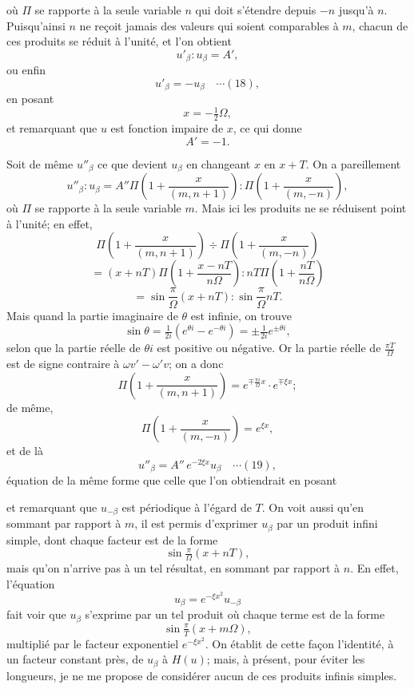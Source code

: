 \documentclass[12pt,a4paper]{article}
\begin{document}
\newpage
\setcounter{page}{166}

o\`u $\Pi$ se rapporte \`a la seule variable $n$ qui doit s'\'etendre depuis $-n$ jusqu'\`a $n$. Puisqu'ainsi $n$ ne re\c{c}oit jamais des valeurs qui soient comparables \`a $m$, chacun de ces produits se r\'eduit \`a l'unit\'e, et l'on obtient
\[
u'_\beta : u_\beta = A',
\]
ou enfin
\[
u'_\beta = -u_\beta \quad\cdots(18),
\]
en posant
\[
x = -\tfrac{1}{2}\Omega,
\]
et remarquant que $u$ est fonction impaire de $x$, ce qui donne
\[
A' = -1.
\]

Soit de m\^eme $u''_\beta$ ce que devient $u_\beta$ en changeant $x$ en $x + T$. On a pareillement
\[
u''_\beta : u_\beta = A''\Pi\!\left(1 + \frac{x}{(m,n+1)}\right) : \Pi\!\left(1 + \frac{x}{(m,-n)}\right),
\]
o\`u $\Pi$ se rapporte \`a la seule variable $m$. Mais ici les produits ne se r\'eduisent point \`a l'unit\'e; en effet,
\[
\Pi\!\left(1 + \frac{x}{(m,n+1)}\right) \div \Pi\!\left(1 + \frac{x}{(m,-n)}\right)
\]
\[
= (x + nT)\Pi\!\left(1 + \frac{x - nT}{n\Omega}\right) : nT\Pi\!\left(1 + \frac{nT}{n\Omega}\right)
\]
\[
= \sin\frac{\pi}{\Omega}(x + nT) : \sin\frac{\pi}{\Omega}nT.
\]
Mais quand la partie imaginaire de $\theta$ est infinie, on trouve
\[
\sin\theta = \tfrac{1}{2i}(e^{\theta i} - e^{-\theta i}) = \pm\tfrac{1}{2i}e^{\pm\theta i},
\]
selon que la partie r\'eelle de $\theta i$ est positive ou n\'egative. Or la partie r\'eelle de $\tfrac{\pi T}{\Omega}$ est de signe contraire \`a $\omega v' - \omega' v$; on a donc
\[
\Pi\!\left(1 + \frac{x}{(m,n+1)}\right) = e^{\mp\frac{\pi i}{\Omega}x}\cdot e^{\mp\xi x};
\]
de m\^eme,
\[
\Pi\!\left(1 + \frac{x}{(m,-n)}\right) = e^{\xi x},
\]
et de l\`a
\[
u''_\beta = A''\,e^{-2\xi x}u_\beta \quad\cdots(19),
\]
\'equation de la m\^eme forme que celle que l'on obtiendrait en posant

\newpage
\setcounter{page}{167}

et remarquant que $u_{-\beta}$ est p\'eriodique \`a l'\'egard de $T$. On voit aussi qu'en sommant par rapport \`a $m$, il est permis d'exprimer $u_\beta$ par un produit infini simple, dont chaque facteur est de la forme
\[
\sin\tfrac{\pi}{\Omega}(x + nT),
\]
mais qu'on n'arrive pas \`a un tel r\'esultat, en sommant par rapport \`a $n$. En effet, l'\'equation
\[
u_\beta = e^{-\xi x^2}u_{-\beta}
\]
fait voir que $u_\beta$ s'exprime par un tel produit o\`u chaque terme est de la forme
\[
\sin\tfrac{\pi}{T}(x + m\Omega),
\]
multipli\'e par le facteur exponentiel $e^{-\xi x^2}$. On \'etablit de cette fa\c{c}on l'identit\'e, \`a un facteur constant pr\`es, de $u_\beta$ \`a $H(u)$; mais, \`a pr\'esent, pour \'eviter les longueurs, je ne me propose de consid\'erer aucun de ces produits infinis simples.
\end{document}
